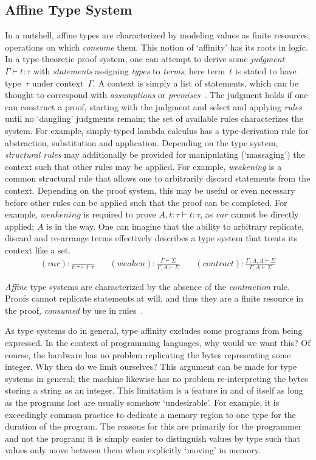 \subsection{Affine Type System}
In a nutshell, affine types are characterized by modeling values as finite resources, operations on which \textit{consume} them. This notion of `affinity' has its roots in logic. In a type-theoretic proof system, one can attempt to derive some \textit{judgment} $\Gamma\vdash{}t:\tau$ with \textit{statements} assigning \textit{types} to \textit{terms}; here term~$t$ is stated to have type~$\tau$ under context~$\Gamma$. A context is simply a list of statements, which can be thought to correspond with \textit{assumptions} or \textit{premises}~\cite{nederpelt2014type}. The judgment holds if one can construct a proof, starting with the judgment and select and applying \textit{rules} until no `dangling' judgments remain; the set of available rules characterizes the system. For example, simply-typed lambda calculus has a type-derivation rule for abstraction, substitution and application. Depending on the type system, \textit{structural rules} may additionally be provided for manipulating (`massaging') the context such that other rules may be applied. For example, \textit{weakening} is a common structural rule that allows one to arbitrarily discard statements from the context. Depending on the proof system, this may be useful or even necessary before other rules can be applied such that the proof can be completed. For example, $weakening$ is required to prove $A, t:\tau\vdash t:\tau$, as $var$ cannot be directly applied; $A$ is in the way. One can imagine that the ability to arbitrary replicate, discard and re-arrange terms effectively describes a type system that treats its context like a set.
\[
\begin{aligned}
(var): \frac{}{t:\tau \vdash t: \tau}
&\quad
(weaken): \frac{\Gamma \vdash \Sigma}{\Gamma, A \vdash \Sigma}
&\quad
(contract): \frac{\Gamma, A, A \vdash \Sigma}{\Gamma, A \vdash \Sigma}
\end{aligned}
\]

\textit{Affine} type systems are characterized by the absence of the \textit{contraction} rule. Proofs cannot replicate statements at will, and thus they are a finite resource in the proof, \textit{consumed} by use in rules~\cite{walker2005substructural}.

As type systems do in general, type affinity excludes some programs from being expressed. In the context of programming languages, why would we want this? Of course, the hardware has no problem replicating the bytes representing some integer. Why then do we limit ourselves? This argument can be made for type systems in general; the machine likewise has no problem re-interpreting the bytes storing a string as an integer. This limitation is a feature in and of itself as long as the programs lost are usually somehow `undesirable'. For example, it is exceedingly common practice to dedicate a memory region to one type for the duration of the program. The reasons for this are primarily for the programmer and not the program; it is simply easier to distinguish values by type such that values only move between them when explicitly `moving' in memory.


